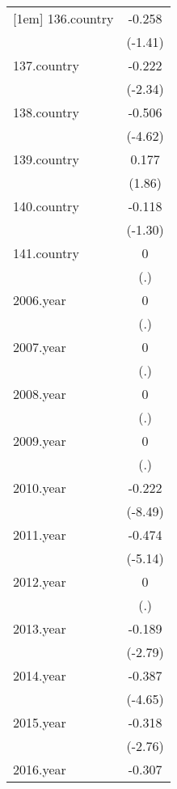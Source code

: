 {\begin{tabular}{l*{1}{c}}
[1em]
136.country &      -0.258         \\
            &     (-1.41)         \\
[1em]
137.country &      -0.222\sym{*}  \\
            &     (-2.34)         \\
[1em]
138.country &      -0.506\sym{***}\\
            &     (-4.62)         \\
[1em]
139.country &       0.177         \\
            &      (1.86)         \\
[1em]
140.country &      -0.118         \\
            &     (-1.30)         \\
[1em]
141.country &           0         \\
            &         (.)         \\
[1em]
2006.year   &           0         \\
            &         (.)         \\
[1em]
2007.year   &           0         \\
            &         (.)         \\
[1em]
2008.year   &           0         \\
            &         (.)         \\
[1em]
2009.year   &           0         \\
            &         (.)         \\
[1em]
2010.year   &      -0.222\sym{***}\\
            &     (-8.49)         \\
[1em]
2011.year   &      -0.474\sym{***}\\
            &     (-5.14)         \\
[1em]
2012.year   &           0         \\
            &         (.)         \\
[1em]
2013.year   &      -0.189\sym{**} \\
            &     (-2.79)         \\
[1em]
2014.year   &      -0.387\sym{***}\\
            &     (-4.65)         \\
[1em]
2015.year   &      -0.318\sym{**} \\
            &     (-2.76)         \\
[1em]
2016.year   &      -0.307\sym{***}\\

\end{tabular}}
